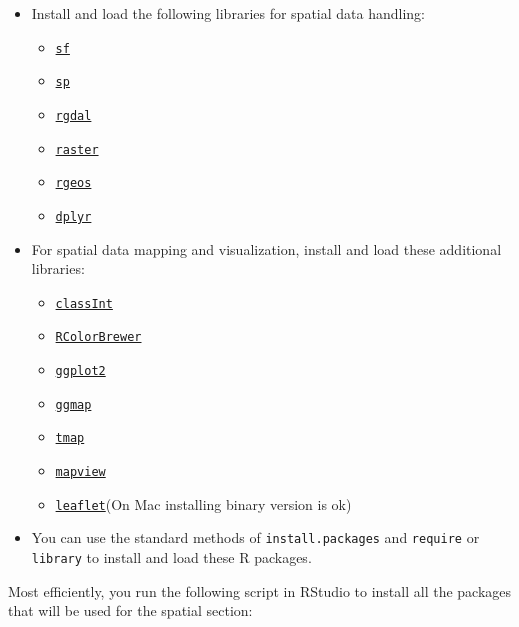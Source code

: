 \documentclass[
  11pt,
]{book}
\providecommand{\tightlist}{%
  \setlength{\itemsep}{0pt}\setlength{\parskip}{0pt}}
\begin{document}
\begin{itemize}
\tightlist
\item
  Install and load the following libraries for spatial data handling:

  \begin{itemize}
  \tightlist
  \item
    \href{https://cran.r-project.org/package=sf}{\texttt{sf}}
  \item
    \href{https://CRAN.R-project.org/package=sp}{\texttt{sp}}
  \item
    \href{https://CRAN.R-project.org/package=rgdal}{\texttt{rgdal}}
  \item
    \href{https://CRAN.R-project.org/package=raster}{\texttt{raster}}
  \item
    \href{https://CRAN.R-project.org/package=rgeos}{\texttt{rgeos}}
  \item
    \href{https://cran.r-project.org/package=dplyr}{\texttt{dplyr}}
  \end{itemize}
\item
  For spatial data mapping and visualization, install and load these additional libraries:

  \begin{itemize}
  \tightlist
  \item
    \href{https://cran.r-project.org/package=classInt}{\texttt{classInt}}
  \item
    \href{https://cran.r-project.org/package=RColorBrewer}{\texttt{RColorBrewer}}
  \item
    \href{https://cran.r-project.org/package=ggplot2}{\texttt{ggplot2}}
  \item
    \href{https://cran.r-project.org/package=ggmap}{\texttt{ggmap}}
  \item
    \href{https://cran.r-project.org/package=tmap}{\texttt{tmap}}
  \item
    \href{https://cran.r-project.org/package=mapview}{\texttt{mapview}}
  \item
    \href{https://cran.r-project.org/package=leaflet}{\texttt{leaflet}}(On Mac installing binary version is ok)
  \end{itemize}
\item
  You can use the standard methods of \texttt{install.packages} and \texttt{require} or \texttt{library} to install and load these R packages.
\end{itemize}

Most efficiently, you run the following script in RStudio to install all the packages that will be used for the spatial section:
\end{document}

